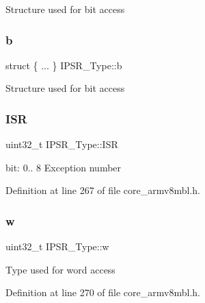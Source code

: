 Structure used for bit access \mbox{\label{union_i_p_s_r___type_aa11b32974d63dd51990089397c4f00f6}} 
\subsubsection{\texorpdfstring{b}{b}\hspace{0.1cm}{\footnotesize\ttfamily [13/13]}}
{\footnotesize\ttfamily struct \{ ... \}   I\+P\+S\+R\+\_\+\+Type\+::b}

Structure used for bit access \mbox{\label{union_i_p_s_r___type_ab46e5f1b2f4d17cfb9aca4fffcbb2fa5}} 
\subsubsection{\texorpdfstring{I\+SR}{ISR}}
{\footnotesize\ttfamily uint32\+\_\+t I\+P\+S\+R\+\_\+\+Type\+::\+I\+SR}

bit\+: 0.. 8 Exception number 

Definition at line 267 of file core\+\_\+armv8mbl.\+h.

\mbox{\label{union_i_p_s_r___type_a4adca999d3a0bc1ae682d73ea7cfa879}} 
\subsubsection{\texorpdfstring{w}{w}}
{\footnotesize\ttfamily uint32\+\_\+t I\+P\+S\+R\+\_\+\+Type\+::w}

Type used for word access 

Definition at line 270 of file core\+\_\+armv8mbl.\+h.



